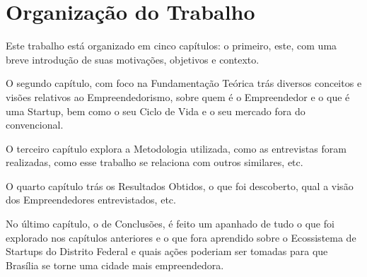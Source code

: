 \section{Organização do Trabalho}
\label{section:organizacao_do_trabalho}

Este trabalho está organizado em cinco capítulos: o primeiro, este, com uma breve introdução de suas motivações, objetivos e contexto. 

O segundo capítulo, com foco na Fundamentação Teórica trás diversos conceitos e visões relativos ao Empreendedorismo, sobre quem é o Empreendedor e o que é uma Startup, bem como o seu Ciclo de Vida e o seu mercado fora do convencional. 

O terceiro capítulo explora a Metodologia utilizada, como as entrevistas foram realizadas, como esse trabalho se relaciona com outros similares, etc. 

O quarto capítulo trás os Resultados Obtidos, o que foi descoberto, qual a visão dos Empreendedores entrevistados, etc.

No último capítulo, o de Conclusões, é feito um apanhado de tudo o que foi explorado nos capítulos anteriores e o que fora aprendido sobre o Ecossistema de Startups do Distrito Federal e quais ações poderiam ser tomadas para que Brasília se torne uma cidade mais empreendedora.

